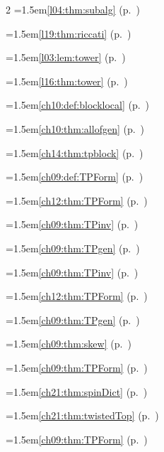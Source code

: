 \begin{multicols}{2}
\hangindent=1.5em\quad \ref{l04:thm:subalg} (p.~\pageref{l04:thm:subalg})\par
\hangindent=1.5em\quad \ref{l19:thm:riccati} (p.~\pageref{l19:thm:riccati})\par
\hangindent=1.5em\quad \ref{l03:lem:tower} (p.~\pageref{l03:lem:tower})\par
\hangindent=1.5em\quad \ref{l16:thm:tower} (p.~\pageref{l16:thm:tower})\par
\hangindent=1.5em\quad \ref{ch10:def:blocklocal} (p.~\pageref{ch10:def:blocklocal})\par
\hangindent=1.5em\quad \ref{ch10:thm:allofgen} (p.~\pageref{ch10:thm:allofgen})\par
\hangindent=1.5em\quad \ref{ch14:thm:tpblock} (p.~\pageref{ch14:thm:tpblock})\par
\hangindent=1.5em\quad \ref{ch09:def:TPForm} (p.~\pageref{ch09:def:TPForm})\par
\hangindent=1.5em\quad \ref{ch12:thm:TPForm} (p.~\pageref{ch12:thm:TPForm})\par
\hangindent=1.5em\quad \ref{ch09:thm:TPinv} (p.~\pageref{ch09:thm:TPinv})\par
\hangindent=1.5em\quad \ref{ch09:thm:TPgen} (p.~\pageref{ch09:thm:TPgen})\par
\hangindent=1.5em\quad \ref{ch09:thm:TPinv} (p.~\pageref{ch09:thm:TPinv})\par
\hangindent=1.5em\quad \ref{ch12:thm:TPForm} (p.~\pageref{ch12:thm:TPForm})\par
\hangindent=1.5em\quad \ref{ch09:thm:TPgen} (p.~\pageref{ch09:thm:TPgen})\par
\hangindent=1.5em\quad \ref{ch09:thm:skew} (p.~\pageref{ch09:thm:skew})\par
\hangindent=1.5em\quad \ref{ch09:thm:TPForm} (p.~\pageref{ch09:thm:TPForm})\par
\hangindent=1.5em\quad \ref{ch21:thm:spinDict} (p.~\pageref{ch21:thm:spinDict})\par
\hangindent=1.5em\quad \ref{ch21:thm:twistedTop} (p.~\pageref{ch21:thm:twistedTop})\par
\hangindent=1.5em\quad \ref{ch09:thm:TPForm} (p.~\pageref{ch09:thm:TPForm})\par

\end{multicols}

